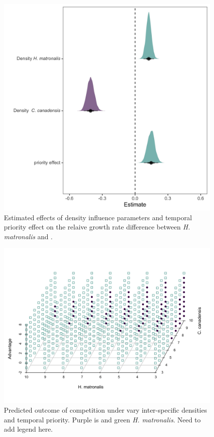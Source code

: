 \documentclass[11pt]{article}\usepackage[]{graphicx}\usepackage[]{color}
\begin{document}
\begin{figure}[h!]
    \centering
\includegraphics[width=\textwidth]{..//figure/mu_plots.jpeg}
    \caption{Estimated effects of density influence parameters and temporal priority effect on the relaive growth rate difference between \textit{H. matronalis} and .  } 
    \label{fig:Cc}
\end{figure}

\begin{figure}[h!]
    \centering
\includegraphics[width=\textwidth]{..//figure/threedpred.jpeg}
    \caption{Predicted outcome of competition under vary inter-specific densities and temporal priority. Purple is  and green \textit{H. matronalis}. Need to add legend here. } 
    \label{fig:Hm}
\end{figure}
\end{document}
